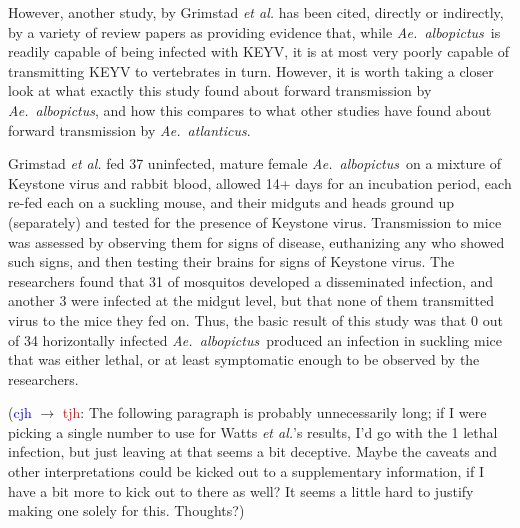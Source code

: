 \documentclass[12pt]{article}
\newcommand{\alb}{\textit{Ae.\ albopictus}}
\newcommand{\atl}{\textit{Ae.\ atlanticus}}
\newcommand{\cjh}{\textcolor{blue}{cjh}}
\newcommand{\tjh}{\textcolor{red}{tjh}}
\newcommand{\msg}[3]{(#1 $\rightarrow$ #2: #3)}
\newcommand{\mct}[1]{\msg\cjh\tjh{#1}}
\begin{document}
            However, another study, by Grimstad \textit{et al.} \cite{grimstad1989recently} has been cited, directly or indirectly, by a variety of review papers\cite{asdf,asdf} as providing evidence that, while \alb\ is readily capable of being infected with KEYV, it is at most very poorly capable of transmitting KEYV to vertebrates in turn. However, it is worth taking a closer look at what exactly this study found about forward transmission by \alb, and how this compares to what other studies have found about forward transmission by \atl.

        Grimstad \textit{et al.} fed 37 uninfected, mature female \alb\ on a mixture of Keystone virus and rabbit blood, allowed 14+ days for an incubation period, each re-fed each on a suckling mouse, and their midguts and heads ground up (separately) and tested for the presence of Keystone virus. Transmission to mice was assessed by observing them for signs of disease, euthanizing any who showed such signs, and then testing their brains for signs of Keystone virus. The researchers found that 31 of mosquitos developed a disseminated infection, and another 3 were infected at the midgut level, but that none of them transmitted virus to the mice they fed on. Thus, the basic result of this study was that 0 out of 34 horizontally infected \alb\ produced an infection in suckling mice that was either lethal, or at least symptomatic enough to be observed by the researchers.

        \mct{The following paragraph is probably unnecessarily long; if I were picking a single number to use for Watts \textit{et al.}'s results, I'd go with the 1 lethal infection, but just leaving at that seems a bit deceptive. Maybe the caveats and other interpretations could be kicked out to a supplementary information, if I have a bit more to kick out to there as well? It seems a little hard to justify making one solely for this. Thoughts?}
\end{document}

